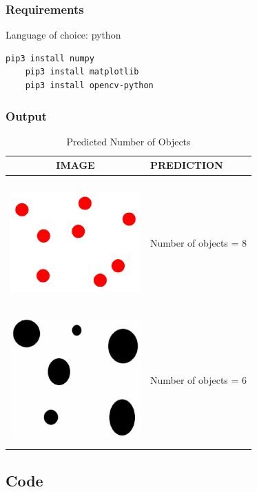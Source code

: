 \subsubsection{Requirements}
Language of choice: python
\begin{lstlisting}[language=bash]
	pip3 install numpy	
	pip3 install matplotlib
	pip3 install opencv-python
\end{lstlisting}

\subsubsection{Output}

\begin{table}[!ht]
	\begin{center}
		\begin{tabular}{ | c | p{5cm} | }
			\hline
			IMAGE & PREDICTION \\ \hline
			\includegraphics[width=50mm, height=50mm]{question_2/Image-1.eps} & 
				Number of objects = 8 \\ \hline
			\includegraphics[width=50mm, height=50mm]{question_2/Image-2.eps} &
				Number of objects = 6 \\ \hline
		\end{tabular}
	\end{center}
\caption{Predicted Number of Objects}
\end{table}

\clearpage
\subsection{Code}
